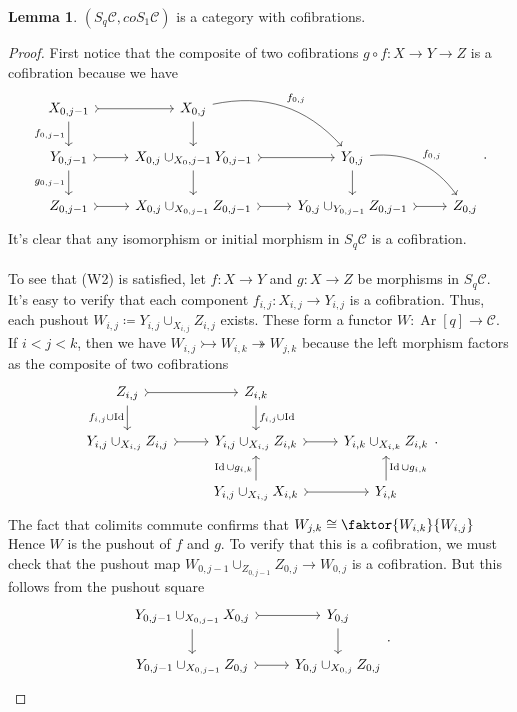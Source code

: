 \documentclass[10pt,letterpaper,cm]{nupset}
\theoremstyle{definition}
\theoremstyle{theorem}
\newtheorem{lemma}[theorem]{Lemma}
\theoremstyle{remark}
\newcommand{\1}{\mathbf{1}}
\renewcommand{\c}{\mathscr{C}}
\newcommand{\0}{\vec 0}
\DeclareMathOperator{\id}{Id}
\DeclareMathOperator{\Ar}{Ar}
\begin{document}
\begin{lemma}
$(S_q\c, coS_1 \c)$ is a category with cofibrations. 
\end{lemma}
\begin{proof}
First notice that the composite of two cofibrations $g \circ f : X \to Y \to Z$ is a cofibration because we have
\[
\begin{tikzcd}
{X_{0, j-1}} \arrow[r, tail] \arrow[d, "{f_{0, j-1}}"'] & {X_{0, j}} \arrow[d] \arrow[rd, "{f_{0, j}}", bend left] &  &  \\
{Y_{0, j-1}} \arrow[d, "{g_{0, j-1}}"'] \arrow[r, tail] & {X_{0, j} \cup_{X_0, j-1} Y_{0, j-1}} \arrow[d] \arrow[r, tail] & {Y_{0, j}} \arrow[d] \arrow[rd, "{f_{0, j}}", bend left] &  \\
{Z_{0, j-1}} \arrow[r, tail] & {X_{0, j} \cup_{X_{0, j-1}} Z_{0, j-1}} \arrow[r, tail] & {Y_{0, j} \cup_{Y_{0, j-1}} Z_{0, j-1}} \arrow[r, tail] & {Z_{0, j}}
\end{tikzcd}.
\]
It's clear that any isomorphism or initial morphism in $S_q \c$ is a cofibration.
\\ \\
To see that (W2) is satisfied, let $f: X \to Y$ and $g : X \to Z$ be morphisms in $S_q \c$. It's easy to verify that each component $f_{i, j}: X_{i, j} \to Y_{i, j}$ is a cofibration. Thus, each pushout $W_{i, j} \coloneqq Y_{i,j} \cup_{X_{i,j}} Z_{i, j}$ exists.
These form a functor $W: \Ar[q] \to \c$. If $i < j < k$, then we have $W_{i,j} \rightarrowtail W_{i, k} \twoheadrightarrow W_{j,k}$ because the left morphism factors as the composite of two cofibrations
\[
\begin{tikzcd}
{Z_{i,j}} \arrow[d, "{f_{i,j} \cup \id}"'] \arrow[r, tail] & {Z_{i,k}} \arrow[d, "{f_{i,j} \cup \id}"] &  \\
{Y_{i,j} \cup_{X_{i,j}} Z_{i,j}} \arrow[r, tail] & {Y_{i,j} \cup_{X_{i,j}} Z_{i,k}} \arrow[r, tail] & {Y_{i,k} \cup_{X_{i,k}} Z_{i,k}} \\
 & {Y_{i,j} \cup_{X_{i,j}} X_{i,k}} \arrow[u, "{\id \cup g_{i,k}}"] \arrow[r, tail] & {Y_{i,k}} \arrow[u, "{\id \cup g_{i,k}}"']
\end{tikzcd}
.\] The fact that colimits commute confirms that $W_{j,k} \cong \faktor{W_{i,k}}{W_{i,j}}$ Hence $W$ is the pushout of $f$ and $g$. To verify that this is a cofibration, we must check that the pushout map $W_{0, j-1} \cup_{Z_{0, j-1}} Z_{0, j} \to W_{0, j}$ is a cofibration. But this follows from the pushout square
\[
\begin{tikzcd}
{Y_{0, j-1}\cup_{X_{0, j-1}} X_{0, j}} \arrow[d] \arrow[r, tail] & {Y_{0, j}} \arrow[d] \\
{Y_{0, j-1}\cup_{X_{0, j-1}} Z_{0, j}} \arrow[r, tail] & {Y_{0, j}\cup_{X_{0, j}} Z_{0, j}}
\end{tikzcd}
.\]
\end{proof}
\end{document}
